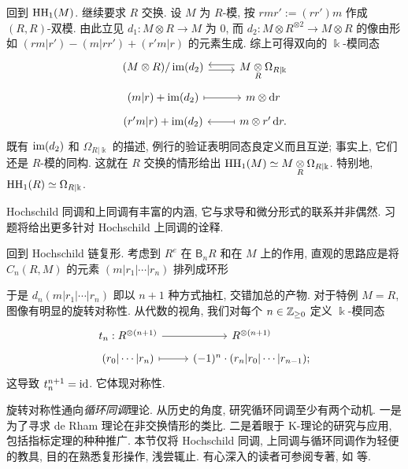 \begin{example}[一次情形: 求导]
	回到 $\operatorname{HH}_1(M)$. 继续要求 $R$ 交换. 设 $M$ 为 $R$-模, 按 $rmr' := (rr')m$ 作成 $(R, R)$-双模. 由此立见 $d_1: M \otimes R \to M$ 为 $0$, 而 $d_2: M \otimes R^{\otimes 2} \to M \otimes R$ 的像由形如 $(rm|r') - (m|rr') + (r'm|r)$ 的元素生成. 综上可得双向的 $\Bbbk$-模同态
	\[\begin{tikzcd}[row sep=tiny]
		(M \otimes R) / \Image(d_2) \arrow[shift right, r] & M \dotimes{R} \Omega_{R|\Bbbk} \arrow[shift right, l] \\
		(m|r) + \Image(d_2) \arrow[mapsto, r] & m \otimes \dd r \\
		(r'm|r) + \Image(d_2) & m \otimes r' \dd r \arrow[mapsto, l] .
	\end{tikzcd}\]
	既有 $\operatorname{im}(d_2)$ 和 $\Omega_{R|\Bbbk}$ 的描述, 例行的验证表明同态良定义而且互逆; 事实上, 它们还是 $R$-模的同构. 这就在 $R$ 交换的情形给出 $\operatorname{HH}_1(M) \simeq M \underset{R}{\otimes} \Omega_{R|\Bbbk}$. 特别地, $\operatorname{HH}_1(R) \simeq \Omega_{R|\Bbbk}$.
\end{example}

Hochschild 同调和上同调有丰富的内涵, 它与求导和微分形式的联系并非偶然. 习题将给出更多针对 Hochschild 上同调的诠释.

回到 Hochschild 链复形. 考虑到 $R^e$ 在 $\mathsf{B}_n R$ 和在 $M$ 上的作用, 直观的思路应是将 $C_n(R, M)$ 的元素 $(m|r_1| \cdots|r_n)$ 排列成环形
\begin{center}\end{center}
于是 $d_n(m|r_1| \cdots |r_n)$ 即以 $n+1$ 种方式抽杠, 交错加总的产物. 对于特例 $M=R$, 图像有明显的旋转对称性. 从代数的视角, 我们对每个 $n \in \mathbb{Z}_{\geq 0}$ 定义 $\Bbbk$-模同态
\[\begin{tikzcd}[row sep=tiny]
	t_n: R^{\otimes (n+1)} \arrow[r] & R^{\otimes (n+1)} \\
	(r_0 | \cdots | r_n) \arrow[mapsto, r] & (-1)^n \cdot (r_n | r_0 | \cdots | r_{n-1}) ;
\end{tikzcd}\]
这导致 $t_n^{n+1} = \mathrm{id}$. 它体现对称性.

旋转对称性通向\emph{循环同调}理论. 从历史的角度, 研究循环同调至少有两个动机. 一是为了寻求 de Rham 理论在非交换情形的类比. 二是着眼于 K-理论的研究与应用, 包括指标定理的种种推广. 本节仅将 Hochschild 同调, 上同调与循环同调作为轻便的教具, 目的在熟悉复形操作, 浅尝辄止. 有心深入的读者可参阅专著, 如 \cite{Lo98, Wi19} 等.

